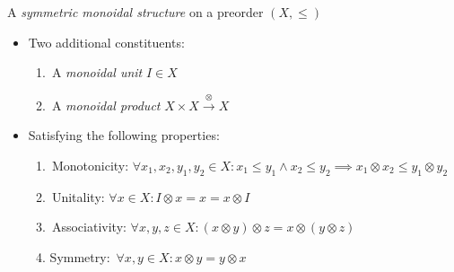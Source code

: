 A \emph{symmetric monoidal structure} on a preorder $(X, \leq)$

\begin{itemize}
    \item Two additional constituents:
          \begin{enumerate}
            \item \,A \emph{monoidal unit} $I \in X$\,
            \item \,A \emph{monoidal product} $X \times X \xrightarrow{\otimes} X$\,
          \end{enumerate}
    \item Satisfying the following properties:
          \begin{enumerate}
            \item  \,Monotonicity: $\forall x_1,x_2,y_1,y_2 \in X: x_1 \leq y_1 \land x_2 \leq y_2 \implies x_1 \otimes x_2 \leq y_1 \otimes y_2$\,
            \item \,Unitality: $\forall x \in X: I \otimes x = x = x \otimes I$\,
            \item \,Associativity: $\forall x,y,z \in X: (x \otimes y) \otimes z = x \otimes (y\otimes z)$\,
            \item Symmetry: \,$\forall x,y \in X: x \otimes y = y \otimes x$\,
          \end{enumerate}
  \end{itemize}
